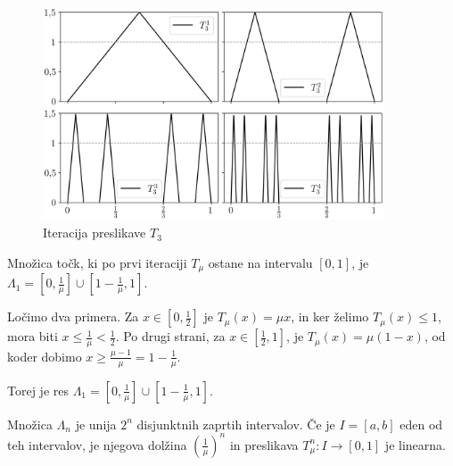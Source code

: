 \documentclass{isrmdelo}
\begin{document}
\begin{figure}[h!]
\begin{center}
\includegraphics[width=0.9\textwidth]{img/tent_3.png}
\end{center}
\caption{Iteracija preslikave $T_3$}
\label{fig:tent_iter_3}
\end{figure}

\begin{trditev}
\label{trditev:lambda_1}
Množica točk, ki po prvi iteraciji $T_\mu$ ostane na intervalu $[0,1]$, je $\Lambda_1 = [0, \frac{1}{\mu}] \cup [1-\frac{1}{\mu}, 1]$.
\end{trditev}

\begin{dokaz}
Ločimo dva primera. Za $x \in [0, \frac{1}{2}]$ je $T_\mu(x) = \mu x$, in ker želimo $T_\mu(x) \leq 1$, mora biti $x \leq \frac{1}{\mu} < \frac{1}{2}$. Po drugi strani, za $x \in [\frac{1}{2}, 1]$, je $T_\mu(x) = \mu (1-x)$, od koder dobimo $x \geq \frac{\mu - 1}{\mu} = 1 - \frac{1}{\mu}$. 

Torej je res $\Lambda_1 = [0, \frac{1}{\mu}] \cup [1-\frac{1}{\mu}, 1]$. \qedhere
\end{dokaz}

\bigskip

\begin{trditev}
\label{trditev:lambda_zgradba}
Množica $\Lambda_n$ je unija $2^n$ disjunktnih zaprtih intervalov. Če je $I = [a,b]$ eden od teh intervalov, je njegova dolžina $(\frac{1}{\mu})^n$ in preslikava $T_\mu^n: I \rightarrow [0,1]$ je linearna.
\end{trditev}
\end{document}
